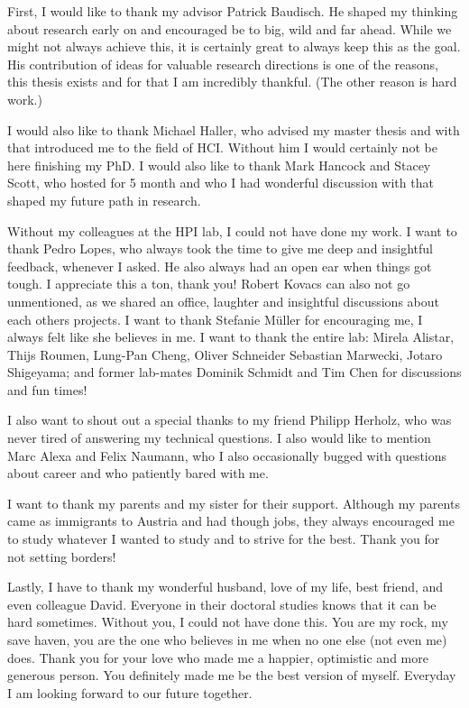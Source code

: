 


First, I would like to thank my advisor Patrick Baudisch. He shaped my thinking about research early on and encouraged be to big, wild and far ahead. While we might not always achieve this, it is certainly great to always keep this as the goal. His contribution of ideas for valuable research directions is one of the reasons, this thesis exists and for that I am incredibly thankful. (The other reason is hard work.)

I would also like to thank Michael Haller, who advised my master thesis and with that introduced me to the field of HCI. Without him I would certainly not be here finishing my PhD. I would also like to thank Mark Hancock and Stacey Scott, who hosted for 5 month and who I had wonderful discussion with that shaped my future path in research. 

Without my colleagues at the HPI lab, I could not have done my work. I want to thank Pedro Lopes, who always took the time to give me deep and insightful feedback, whenever I asked. He also always had an open ear when things got tough. I appreciate this a ton, thank you! Robert Kovacs can also not go unmentioned, as we shared an office, laughter and insightful discussions about each others projects. I want to thank Stefanie Müller for encouraging me, I always felt like she believes in me. I want to thank the entire lab: Mirela Alistar, Thijs Roumen, Lung-Pan Cheng, Oliver Schneider Sebastian Marwecki, Jotaro Shigeyama; and former lab-mates Dominik Schmidt and Tim Chen for discussions and fun times! 

I also want to shout out a special thanks to my friend Philipp Herholz, who was never tired of answering my technical questions. I also would like to mention Marc Alexa and Felix Naumann, who I also occasionally bugged with questions about career and who patiently bared with me. 

I want to thank my parents and my sister for their support. Although my parents came as immigrants to Austria and had though jobs, they always encouraged me to study whatever I wanted to study and to strive for the best. Thank you for not setting borders!

Lastly, I have to thank my wonderful husband, love of my life, best friend, and even colleague David. Everyone in their doctoral studies knows that it can be hard sometimes. Without you, I could not have done this. You are my rock, my save haven, you are the one who believes in me when no one else (not even me) does. Thank you for your love who made me a happier, optimistic and more generous person. You definitely made me be the best version of myself. Everyday I am looking forward to our future together.